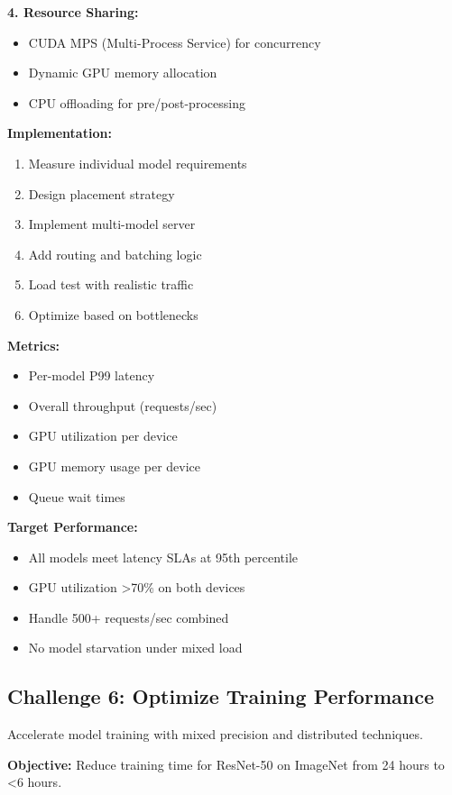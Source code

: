 \textbf{4. Resource Sharing:}
\begin{itemize}
    \item CUDA MPS (Multi-Process Service) for concurrency
    \item Dynamic GPU memory allocation
    \item CPU offloading for pre/post-processing
\end{itemize}

\textbf{Implementation:}
\begin{enumerate}
    \item Measure individual model requirements
    \item Design placement strategy
    \item Implement multi-model server
    \item Add routing and batching logic
    \item Load test with realistic traffic
    \item Optimize based on bottlenecks
\end{enumerate}

\textbf{Metrics:}
\begin{itemize}
    \item Per-model P99 latency
    \item Overall throughput (requests/sec)
    \item GPU utilization per device
    \item GPU memory usage per device
    \item Queue wait times
\end{itemize}

\textbf{Target Performance:}
\begin{itemize}
    \item All models meet latency SLAs at 95th percentile
    \item GPU utilization >70\% on both devices
    \item Handle 500+ requests/sec combined
    \item No model starvation under mixed load
\end{itemize}

\subsection{Challenge 6: Optimize Training Performance}

Accelerate model training with mixed precision and distributed techniques.

\textbf{Objective:} Reduce training time for ResNet-50 on ImageNet from 24 hours to <6 hours.

